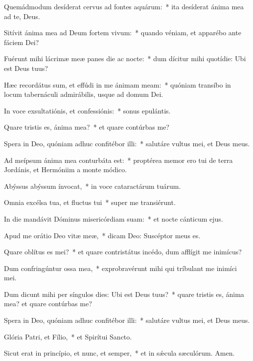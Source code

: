 \item Quemádmodum desíderat cervus ad fontes aquárum:~* ita desíderat ánima mea ad te, Deus.

\item Sitívit ánima mea ad Deum fortem vivum:~* quando véniam, et apparébo ante fáciem Dei?

\item Fuérunt mihi lácrimæ meæ panes die ac nocte:~* dum dícitur mihi quotídie: Ubi est Deus tuus?

\item Hæc recordátus sum, et effúdi in me ánimam meam:~* quóniam transíbo in locum tabernáculi admirábilis, usque ad domum Dei.

\item In voce exsultatiónis, et confessiónis:~* sonus epulántis.

\item Quare tristis es, ánima mea?~* et quare contúrbas me?

\item Spera in Deo, quóniam adhuc confitébor illi:~* salutáre vultus mei, et Deus meus.

\item Ad meípsum ánima mea conturbáta est:~* proptérea memor ero tui de terra Jordánis, et Hermóniim a monte módico.

\item Abýssus abýssum ínvocat,~* in voce cataractárum tuárum.

\item Omnia excélsa tua, et fluctus tui~* super me transiérunt.

\item In die mandávit Dóminus misericórdiam suam:~* et nocte cánticum ejus.

\item Apud me orátio Deo vitæ meæ,~* dicam Deo: Suscéptor meus es.

\item Quare oblítus es mei?~* et quare contristátus incédo, dum afflígit me inimícus?

\item Dum confringúntur ossa mea,~* exprobravérunt mihi qui tríbulant me inimíci mei.

\item Dum dicunt mihi per síngulos dies: Ubi est Deus tuus?~* quare tristis es, ánima mea? et quare contúrbas me?

\item Spera in Deo, quóniam adhuc confitébor illi:~* salutáre vultus mei, et Deus meus.

\item Glória Patri, et Fílio,~* et Spirítui Sancto.

\item Sicut erat in princípio, et nunc, et semper,~* et in sǽcula sæculórum. Amen.

